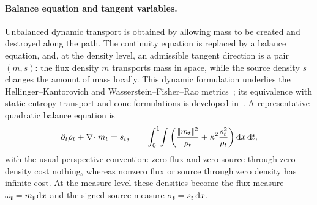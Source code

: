 \paragraph{Balance equation and tangent variables.}
Unbalanced dynamic transport is obtained by allowing mass to be created and destroyed along the path. The continuity equation is replaced by a balance equation, and, at the density level, an admissible tangent direction is a pair \((m,s)\): the flux density \(m\) transports mass in space, while the source density \(s\) changes the amount of mass locally. This dynamic formulation underlies the Hellinger--Kantorovich and Wasserstein--Fisher--Rao metrics~\cite{LieroMielkeSavareShort,2017-chizat-focm}; its equivalence with static entropy-transport and cone formulations is developed in~\cite{LieroMielkeSavareLong,2015-chizat-unbalanced}. A representative quadratic balance equation is
	\[
		\partial_t\rho_t+\nabla\!\cdot m_t=s_t,
		\qquad
		\int_0^1\!\int
		\left(\frac{|\!| m_t |\!|^2}{\rho_t}+\kappa^2\frac{s_t^2}{\rho_t}\right)\mathrm{d} x\,\mathrm{d} t,
	\]
	with the usual perspective convention: zero flux and zero source through zero density cost nothing, whereas nonzero flux or source through zero density has infinite cost. At the measure level these densities become the flux measure \(\omega_t=m_t\,\mathrm{d} x\) and the signed source measure \(\sigma_t=s_t\,\mathrm{d} x\).

